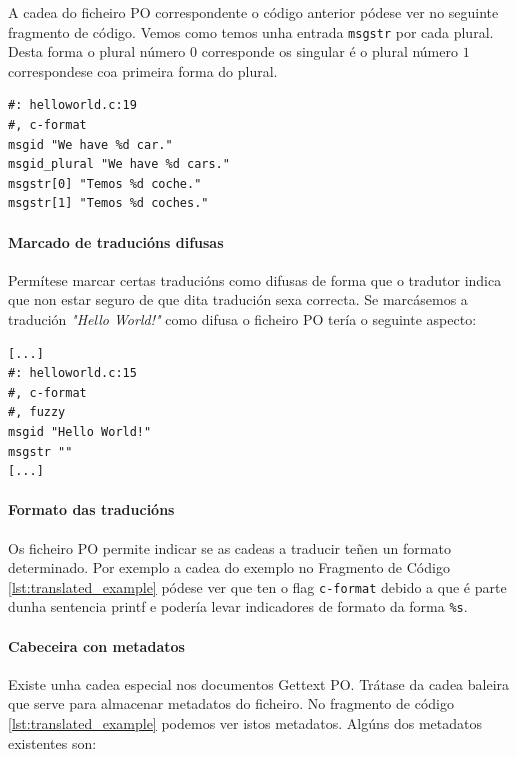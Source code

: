 A cadea do ficheiro PO correspondente o código anterior pódese ver no seguinte fragmento de código. Vemos como temos unha entrada \lstinline{msgstr} por cada plural. Desta forma o plural número $0$ corresponde os singular é o plural número $1$ correspondese coa primeira forma do plural.

\begin{lstlisting}[caption=Plurais en GetText (Ficheiro PO).]
#: helloworld.c:19
#, c-format
msgid "We have %d car."
msgid_plural "We have %d cars."
msgstr[0] "Temos %d coche."
msgstr[1] "Temos %d coches."
\end{lstlisting}


\paragraph {Marcado de traducións difusas}
Permítese marcar certas traducións como difusas de forma que o tradutor indica que non estar seguro de que dita tradución sexa correcta. Se marcásemos a tradución \emph{"Hello World!"} como difusa o ficheiro PO tería o seguinte aspecto:

\begin{lstlisting}[label=some-code,caption=Ficheiro POT con comentario.]
[...]
#: helloworld.c:15
#, c-format
#, fuzzy
msgid "Hello World!"
msgstr ""
[...]
\end{lstlisting}

\paragraph {Formato das traducións}
Os ficheiro PO permite indicar se as cadeas a traducir teñen un formato determinado. Por exemplo a cadea do exemplo no Fragmento de Código \ref{lst:translated_example} pódese ver que ten o flag \lstinline{c-format} debido a que é parte dunha sentencia printf e podería levar indicadores de formato da forma \lstinline{%s}.

\paragraph {Cabeceira con metadatos}
Existe unha cadea especial nos documentos Gettext PO. Trátase da cadea baleira que serve para almacenar metadatos do ficheiro. No fragmento de código \ref{lst:translated_example} podemos ver istos metadatos. Algúns dos metadatos existentes son:

